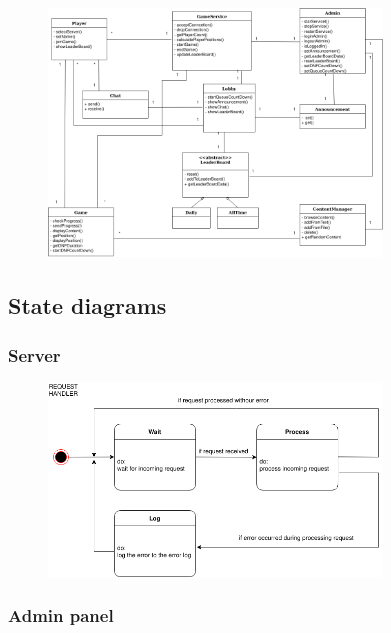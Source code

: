 \documentclass[titlepage]{article}
\begin{document}
\begin{figure}[ht]
	\centering
	\includegraphics[width=0.79\textwidth]{class_diagram.png}
\end{figure}

\subsection{State diagrams}

\subsubsection{Server}

\begin{figure}[ht]
	\centering
	\includegraphics[width=0.79\textwidth]{state_diagram_server.png}
\end{figure}

\subsubsection{Admin panel}
\end{document}
